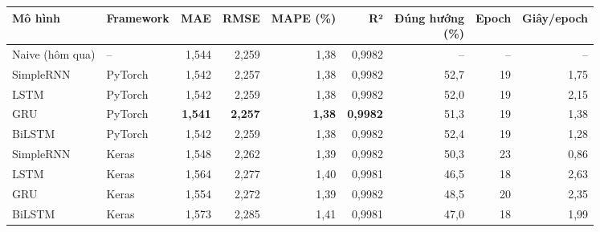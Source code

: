 \begin{tabular}{llrrrrrrr}
\toprule
Mô hình & Framework & MAE & RMSE & MAPE (\%) & R² & \makecell[r]{Đúng hướng\\(\%)} & Epoch & Giây/epoch \\
\midrule
Naive (hôm qua) & -- & 1{,}544 & 2{,}259 & 1{,}38 & 0{,}9982 & -- & -- & -- \\
\midrule
SimpleRNN & PyTorch & 1{,}542 & 2{,}257 & 1{,}38 & 0{,}9982 & 52{,}7 & 19 & 1{,}75 \\
LSTM & PyTorch & 1{,}542 & 2{,}259 & 1{,}38 & 0{,}9982 & 52{,}0 & 19 & 2{,}15 \\
GRU & PyTorch & \textbf{1{,}541} & \textbf{2{,}257} & \textbf{1{,}38} & \textbf{0{,}9982} & 51{,}3 & 19 & 1{,}38 \\
BiLSTM & PyTorch & 1{,}542 & 2{,}259 & 1{,}38 & 0{,}9982 & 52{,}4 & 19 & 1{,}28 \\
\midrule
SimpleRNN & Keras & 1{,}548 & 2{,}262 & 1{,}39 & 0{,}9982 & 50{,}3 & 23 & 0{,}86 \\
LSTM & Keras & 1{,}564 & 2{,}277 & 1{,}40 & 0{,}9981 & 46{,}5 & 18 & 2{,}63 \\
GRU & Keras & 1{,}554 & 2{,}272 & 1{,}39 & 0{,}9982 & 48{,}5 & 20 & 2{,}35 \\
BiLSTM & Keras & 1{,}573 & 2{,}285 & 1{,}41 & 0{,}9981 & 47{,}0 & 18 & 1{,}99 \\
\bottomrule
\end{tabular}
